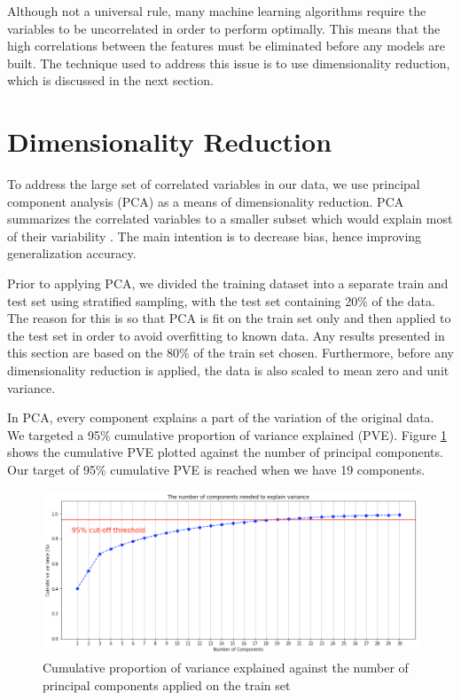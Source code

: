 Although not a universal rule, many machine learning algorithms require the variables to be uncorrelated in order to perform optimally. This means that the high correlations between the features must be eliminated before any models are built. The technique used to address this issue is to use dimensionality reduction, which is discussed in the next section.

\section{Dimensionality Reduction}

To address the large set of correlated variables in our data, we use principal component analysis (PCA) as a means of dimensionality reduction. PCA summarizes the correlated variables to a smaller subset which would explain most of their variability \cite{intro_stat_learning}. The main intention is to decrease bias, hence improving generalization accuracy.

Prior to applying PCA, we divided the training dataset into a separate train and test set using stratified sampling, with the test set containing 20\% of the data. The reason for this is so that PCA is fit on the train set only and then applied to the test set in order to avoid overfitting to known data. Any results presented in this section are based on the 80\% of the train set chosen. Furthermore, before any dimensionality reduction is applied, the data is also scaled to mean zero and unit variance.

In PCA, every component explains a part of the variation of the original data. We targeted a 95\% cumulative proportion of variance explained (PVE). Figure \ref{fig:pve} shows the cumulative PVE plotted against the number of principal components. Our target of 95\% cumulative PVE is reached when we have 19 components.

\begin{figure}
   \centering
   \includegraphics[width=\textwidth]{images/cumulative_pve.png}
   \caption{Cumulative proportion of variance explained against the number of principal components applied on the train set}
   \label{fig:pve}
\end{figure}

